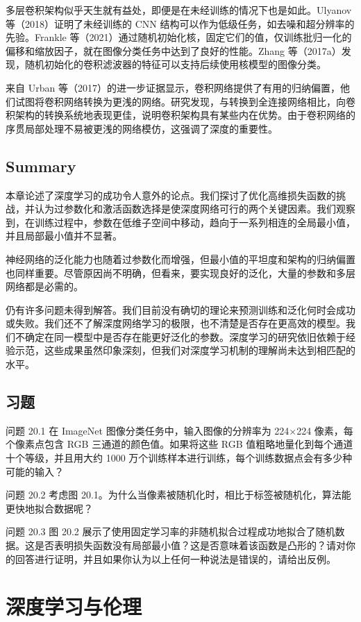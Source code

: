 \documentclass[lang=cn,newtx,10pt,scheme=chinese]{elegantbook}
\begin{document}
多层卷积架构似乎天生就有益处，即便是在未经训练的情况下也是如此。Ulyanov 等（2018）证明了未经训练的 CNN 结构可以作为低级任务，如去噪和超分辨率的先验。Frankle 等（2021）通过随机初始化核，固定它们的值，仅训练批归一化的偏移和缩放因子，就在图像分类任务中达到了良好的性能。Zhang 等（2017a）发现，随机初始化的卷积滤波器的特征可以支持后续使用核模型的图像分类。

来自 Urban 等（2017）的进一步证据显示，卷积网络提供了有用的归纳偏置，他们试图将卷积网络转换为更浅的网络。研究发现，与转换到全连接网络相比，向卷积架构的转换系统地表现更佳，说明卷积架构具有某些内在优势。由于卷积网络的序贯局部处理不易被更浅的网络模仿，这强调了深度的重要性。


\section{Summary}
本章论述了深度学习的成功令人意外的论点。我们探讨了优化高维损失函数的挑战，并认为过参数化和激活函数选择是使深度网络可行的两个关键因素。我们观察到，在训练过程中，参数在低维子空间中移动，趋向于一系列相连的全局最小值，并且局部最小值并不显著。

神经网络的泛化能力也随着过参数化而增强，但最小值的平坦度和架构的归纳偏置也同样重要。尽管原因尚不明确，但看来，要实现良好的泛化，大量的参数和多层网络都是必需的。

仍有许多问题未得到解答。我们目前没有确切的理论来预测训练和泛化何时会成功或失败。我们还不了解深度网络学习的极限，也不清楚是否存在更高效的模型。我们不确定在同一模型中是否存在能更好泛化的参数。深度学习的研究依旧依赖于经验示范，这些成果虽然印象深刻，但我们对深度学习机制的理解尚未达到相匹配的水平。

\section{习题}
问题 20.1 在 ImageNet 图像分类任务中，输入图像的分辨率为 224×224 像素，每个像素点包含 RGB 三通道的颜色值。如果将这些 RGB 值粗略地量化到每个通道十个等级，并且用大约 1000 万个训练样本进行训练，每个训练数据点会有多少种可能的输入？

问题 20.2 考虑图 20.1。为什么当像素被随机化时，相比于标签被随机化，算法能更快地拟合数据呢？

问题 20.3 图 20.2 展示了使用固定学习率的非随机拟合过程成功地拟合了随机数据。这是否表明损失函数没有局部最小值？这是否意味着该函数是凸形的？请对你的回答进行证明，并且如果你认为以上任何一种说法是错误的，请给出反例。

\chapter{深度学习与伦理}
\end{document}
